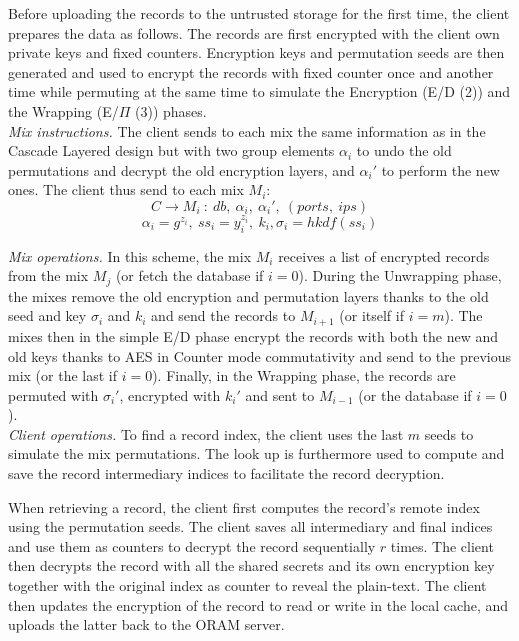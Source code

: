 \documentclass{llncs}
\begin{document}
Before uploading the records to the untrusted storage for the first time, the client prepares the data as follows. The records are first encrypted with the client own private keys and fixed counters. Encryption keys and permutation seeds are then generated and used to encrypt the records  with fixed counter once and another time while permuting at the same time to simulate the Encryption (E/D (2)) and the Wrapping (E/$\Pi$ (3)) phases.\\

\noindent\textit{Mix instructions.}
The client sends to each mix the same information as in the Cascade Layered design but with two group elements $\alpha_{i}$ to undo the old permutations and decrypt the old encryption layers, and $\alpha_{i}'$ to perform the new ones. The client thus send to each mix $M_i$:
$$C \rightarrow M_i\ :\ db,\ \alpha_{i},\ \alpha_{i}',\ (ports,\ ips) $$
$$ \alpha_i = g^{z_i},\ ss_i = y_i^{z_i},\ k_i, \sigma_i=hkdf(ss_i)$$


\noindent\textit{Mix operations.} In this scheme, the mix $M_i$ receives a list of encrypted records from the mix $M_j$ (or fetch the database if $i=0$). During the Unwrapping phase, the mixes remove the old encryption and permutation layers thanks to the old seed and key $\sigma_{i}$ and $k_{i}$ and send the records to $M_{i+1}$ (or itself if $i=m$). The mixes then in the simple E/D phase encrypt the records with both the new and old keys thanks to AES in Counter mode commutativity and send to the previous mix (or the last if $i=0$). Finally, in the Wrapping phase, the records are permuted with $\sigma_{i}'$, encrypted with $k_{i}'$ and sent to $M_{i-1}$ (or the database if $i=0$).\\

\noindent\textit{Client operations.} To find a record index, the client uses the last $m$ seeds to simulate the mix permutations. The look up is furthermore used to compute and save the record intermediary indices to facilitate the record decryption. 

When retrieving a record, the client first computes the record's remote index using the permutation seeds. The client saves all intermediary and final indices and use them as counters to decrypt the record sequentially $r$ times. The client then decrypts the record with all the shared secrets and its own encryption key together with the original index as counter to reveal the plain-text. The client then updates the encryption of the record to read or write in the local cache, and uploads the latter back to the ORAM server.\\
\end{document}
